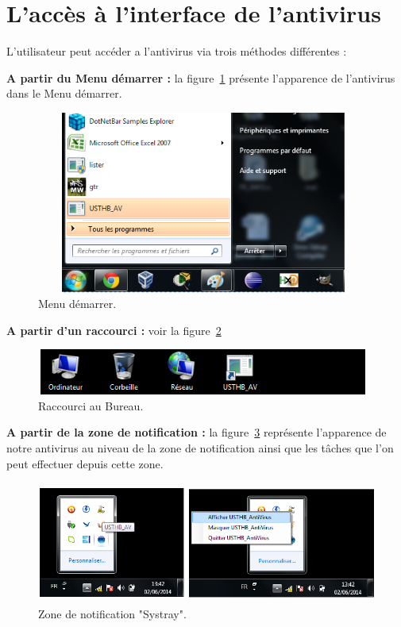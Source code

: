 \section{L'accès à l'interface de l'antivirus}
L'utilisateur peut accéder a l'antivirus via trois méthodes différentes :\\
\begin{list}{•}{}

\item \textbf{A partir du Menu démarrer : }la figure~\ref{fig :demar} présente l'apparence de l'antivirus dans le Menu démarrer.
\begin{figure}[H]
\begin{center}
\includegraphics[width=11cm, height=6cm]{Figures/demar.png}
\caption{Menu démarrer.}
\label{fig :demar} 
\end{center}
\end{figure}

\item \textbf{A partir d'un raccourci : }voir la figure~\ref{fig :racc}
\begin{figure}[H]
\begin{center}
\includegraphics[width=11cm, height=1.5cm]{Figures/racc.png}
\caption{Raccourci au Bureau.}
\label{fig :racc} 
\end{center}
\end{figure}
\item \textbf{A partir de la zone de notification : } la figure~\ref{fig :systray} représente l'apparence de notre antivirus au niveau de la zone de notification ainsi que les tâches que l'on peut effectuer depuis cette zone.
\begin{figure}[H]
\begin{center}
\includegraphics[width=13cm, height=4cm]{Figures/systray.png}
\caption{Zone de notification "Systray".}
\label{fig :systray} 
\end{center}
\end{figure}
\end{list}
